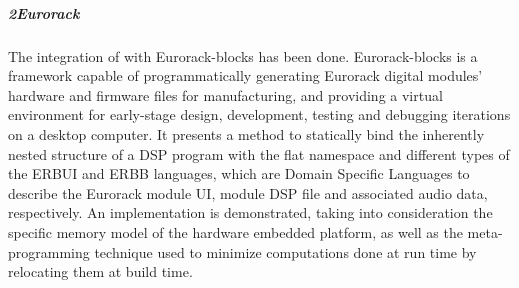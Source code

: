 \subparagraph{\F{}2Eurorack}

The integration of \F{} with Eurorack-blocks has been done.
Eurorack-blocks is a framework capable of programmatically generating
Eurorack digital modules' hardware and firmware files for manufacturing,
and providing a virtual environment for early-stage design, development,
testing and debugging iterations on a desktop computer. It presents a
method to statically bind the inherently nested structure of a \F{} DSP
program with the flat namespace and different types of the ERBUI and
ERBB languages, which are Domain Specific Languages to describe the
Eurorack module UI, module DSP file and associated audio data,
respectively. An implementation is demonstrated, taking into
consideration the specific memory model of the hardware embedded
platform, as well as the meta-programming technique used to minimize
computations done at run time by relocating them at build time.
